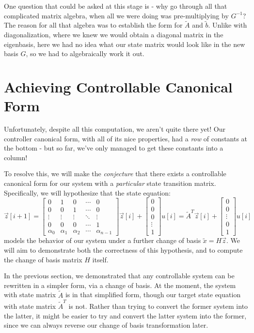 \documentclass[letterpaper]{article}
\theoremstyle{remark}
\renewcommand{\tilde}[1]{\widetilde{#1}}
\newcommand{\mat}[1]{\ensuremath{\begin{bmatrix}#1\end{bmatrix}}}
\begin{document}
One question that could be asked at this stage is - why go through all that complicated matrix algebra, when all we were doing was pre-multiplying by $G^{-1}$? The reason for all that algebra was to establish the form for $\tilde{A}$ and $\tilde{b}$. Unlike with diagonalization, where we knew we would obtain a diagonal matrix in the eigenbasis, here we had no idea what our state matrix would look like in the new basis $G$, so we had to algebraically work it out.

\section{Achieving Controllable Canonical Form}
Unfortunately, despite all this computation, we aren't quite there yet! Our controller canonical form, with all of its nice properties, had a \emph{row} of constants at the bottom - but so far, we've only managed to get these constants into a column! 

To resolve this, we will make the \emph{conjecture} that there exists a controllable canonical form for our system with a \emph{particular} state transition matrix. Specifically, we will hypothesize that the state equation:
\[
    \vec{z}[i+1] = \mat{
    0 & 1 & 0 & \cdots & 0 \\ 
    0 & 0 & 1 & \cdots & 0 \\
    \vdots & \vdots & \vdots & \ddots & \vdots \\
    0 & 0 & 0 & \cdots & 1 \\
    \alpha_0 & \alpha_1 & \alpha_2 & \cdots & \alpha_{n - 1}
    } \vec{z}[i] + \mat{0 \\ 0 \\ 0 \\ \vdots \\ 1} u[i] = \tilde{A}^T\vec{z}[i] + \mat{0 \\ 0 \\ \vdots \\ 0 \\ 1} u[i]
\]
models the behavior of our system under a further change of basis $\tilde{x} = H\vec{z}$. We will aim to demonstrate both the correctness of this hypothesis, and to compute the change of basis matrix $H$ itself.

In the previous section, we demonstrated that any controllable system can be rewritten in a simpler form, via a change of basis. At the moment, the system with state matrix $\tilde{A}$ is in that simplified form, though our target state equation with state matrix $\tilde{A}^T$ is not. Rather than trying to convert the former system into the latter, it might be easier to try and convert the latter system into the former, since we can always reverse our change of basis transformation later.
\end{document}
